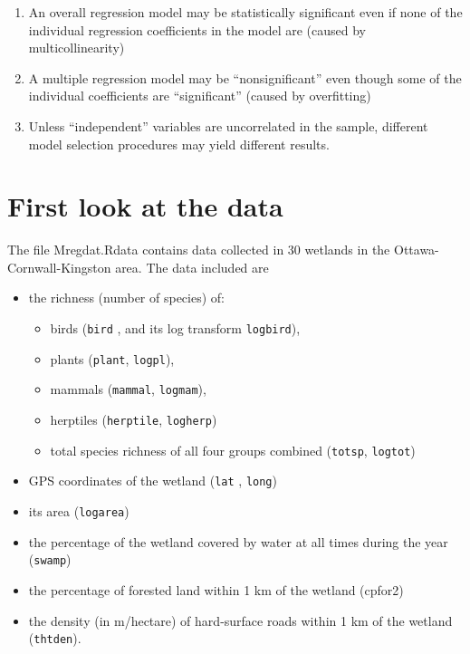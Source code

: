 \documentclass[
  12pt,
]{book}
\providecommand{\tightlist}{%
  \setlength{\itemsep}{0pt}\setlength{\parskip}{0pt}}
\begin{document}
\begin{enumerate}
\def\labelenumi{\arabic{enumi}.}
\tightlist
\item
  An overall regression model may be statistically significant even if none of the individual regression coefficients in the model are (caused by multicollinearity)
\item
  A multiple regression model may be ``nonsignificant'' even though some of the individual coefficients are ``significant'' (caused by overfitting)
\item
  Unless ``independent'' variables are uncorrelated in the sample, different model selection procedures may yield different results.
\end{enumerate}

\hypertarget{first-look-at-the-data}{%
\section{First look at the data}\label{first-look-at-the-data}}

The file Mregdat.Rdata contains data collected in 30 wetlands in the Ottawa-Cornwall-Kingston area. The data included are

\begin{itemize}
\tightlist
\item
  the richness (number of species) of:

  \begin{itemize}
  \tightlist
  \item
    birds (\texttt{bird} , and its log transform \texttt{logbird}),
  \item
    plants (\texttt{plant}, \texttt{logpl}),
  \item
    mammals (\texttt{mammal}, \texttt{logmam}),
  \item
    herptiles (\texttt{herptile}, \texttt{logherp})
  \item
    total species richness of all four groups combined (\texttt{totsp}, \texttt{logtot})
  \end{itemize}
\item
  GPS coordinates of the wetland (\texttt{lat} , \texttt{long})
\item
  its area (\texttt{logarea})
\item
  the percentage of the wetland covered by water at all times during the year (\texttt{swamp})
\item
  the percentage of forested land within 1 km of the wetland (cpfor2)
\item
  the density (in m/hectare) of hard-surface roads within 1 km of the wetland (\texttt{thtden}).
\end{itemize}
\end{document}
